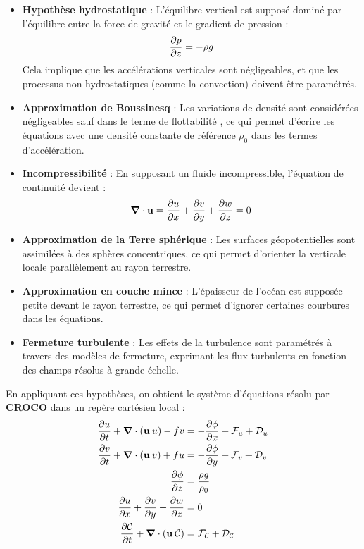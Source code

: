 \begin{itemize}
    \item \textbf{Hypothèse hydrostatique} : L'équilibre vertical est supposé dominé par l'équilibre entre la force de gravité et le gradient de pression :
    \begin{equation}
        \frac{\partial p}{\partial z} = - \rho g
    \end{equation}
    Cela implique que les accélérations verticales sont négligeables, et que les processus non hydrostatiques (comme la convection) doivent être paramétrés.

    \item \textbf{Approximation de Boussinesq} : Les variations de densité sont considérées négligeables sauf dans le terme de flottabilité \cite{boussinesq_essai_1877}, ce qui permet d’écrire les équations avec une densité constante de référence $\rho_0$ dans les termes d’accélération.

    \item \textbf{Incompressibilité} : En supposant un fluide incompressible, l'équation de continuité devient :
    \begin{equation}
        \boldsymbol{\nabla} \cdot \mathbf{u} = \frac{\partial u}{\partial x} + \frac{\partial v}{\partial y} + \frac{\partial w}{\partial z} = 0
    \end{equation}

    \item \textbf{Approximation de la Terre sphérique} : Les surfaces géopotentielles sont assimilées à des sphères concentriques, ce qui permet d’orienter la verticale locale parallèlement au rayon terrestre.

    \item \textbf{Approximation en couche mince} : L'épaisseur de l'océan est supposée petite devant le rayon terrestre, ce qui permet d'ignorer certaines courbures dans les équations.

    \item \textbf{Fermeture turbulente} : Les effets de la turbulence sont paramétrés à travers des modèles de fermeture, exprimant les flux turbulents en fonction des champs résolus à grande échelle.
\end{itemize}

En appliquant ces hypothèses, on obtient le système d’équations résolu par \textbf{CROCO} dans un repère cartésien local :
\begin{subequations}
\begin{align}
    \frac{\partial u}{\partial t} + \boldsymbol{\nabla} \cdot ( \mathbf{u} \: u ) - f v &= - \frac{\partial \phi}{\partial x} + \mathcal{F}_u + \mathcal{D}_u \\
    \frac{\partial v}{\partial t} + \boldsymbol{\nabla} \cdot ( \mathbf{u} \: v ) + f u &= - \frac{\partial \phi}{\partial y} + \mathcal{F}_v + \mathcal{D}_v \\
    \frac{\partial \phi}{\partial z} &= \frac{\rho g}{\rho_0} \\
    \frac{\partial u}{\partial x} + \frac{\partial v}{\partial y} + \frac{\partial w}{\partial z} &= 0 \\
    \frac{\partial \mathcal{C}}{\partial t} + \boldsymbol{\nabla} \cdot ( \mathbf{u} \: \mathcal{C} ) &= \mathcal{F}_\mathcal{C} + \mathcal{D}_\mathcal{C}
\end{align}
\label{eq:equations}
\end{subequations}

